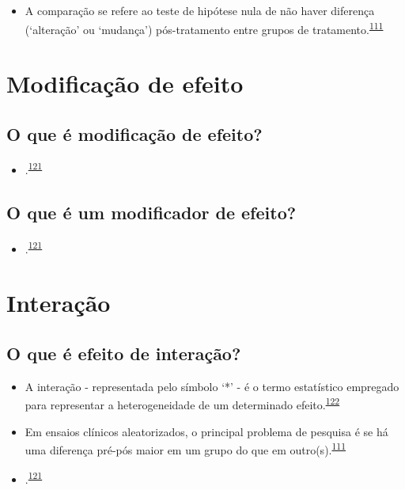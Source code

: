 \documentclass[
]{book}
\providecommand{\tightlist}{%
  \setlength{\itemsep}{0pt}\setlength{\parskip}{0pt}}
\begin{document}
\begin{itemize}
\tightlist
\item
  A comparação se refere ao teste de hipótese nula de não haver diferença (`alteração' ou `mudança') pós-tratamento entre grupos de tratamento.\textsuperscript{\protect\hyperlink{ref-bland2011}{111}}
\end{itemize}

\hypertarget{modificacao}{%
\section{Modificação de efeito}\label{modificacao}}

\hypertarget{o-que-uxe9-modificauxe7uxe3o-de-efeito}{%
\subsection{O que é modificação de efeito?}\label{o-que-uxe9-modificauxe7uxe3o-de-efeito}}

\begin{itemize}
\tightlist
\item
  .\textsuperscript{\protect\hyperlink{ref-Bours2023}{121}}
\end{itemize}

\hypertarget{o-que-uxe9-um-modificador-de-efeito}{%
\subsection{O que é um modificador de efeito?}\label{o-que-uxe9-um-modificador-de-efeito}}

\begin{itemize}
\tightlist
\item
  .\textsuperscript{\protect\hyperlink{ref-Bours2023}{121}}
\end{itemize}

\hypertarget{interacao}{%
\section{Interação}\label{interacao}}

\hypertarget{o-que-uxe9-efeito-de-interauxe7uxe3o}{%
\subsection{O que é efeito de interação?}\label{o-que-uxe9-efeito-de-interauxe7uxe3o}}

\begin{itemize}
\item
  A interação - representada pelo símbolo `*' - é o termo estatístico empregado para representar a heterogeneidade de um determinado efeito.\textsuperscript{\protect\hyperlink{ref-Altman1996}{122}}
\item
  Em ensaios clínicos aleatorizados, o principal problema de pesquisa é se há uma diferença pré-pós maior em um grupo do que em outro(s).\textsuperscript{\protect\hyperlink{ref-bland2011}{111}}
\item
  .\textsuperscript{\protect\hyperlink{ref-Bours2023}{121}}
\end{itemize}
\end{document}
